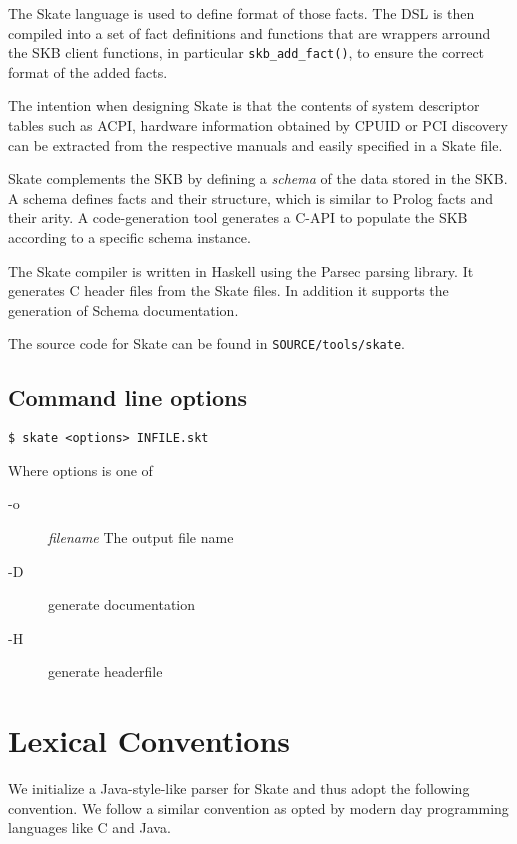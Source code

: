 \documentclass[a4paper,11pt,twoside]{report}
\begin{document}
{{The Skate language is used to define format of those facts. The DSL is then 
compiled into a set of fact definitions and functions that are wrappers arround
the SKB client functions, in particular \texttt{skb\_add\_fact()}, to ensure
the correct format of the added facts.  

The intention when designing Skate is that the contents of system descriptor
tables such as ACPI, hardware information obtained by CPUID or PCI discovery
can be extracted from the respective manuals and easily specified in a Skate 
file. 

Skate complements the SKB by defining a \emph{schema} of the data stored in
the SKB. A schema defines facts and their structure, which is similar to Prolog
facts and their arity. A code-generation tool generates a C-API to populate the
SKB according to a specific schema instance.

The Skate compiler is written in Haskell using the Parsec parsing library. It
generates C header files from the Skate files. In addition it supports the 
generation of Schema documentation.

The source code for Skate can be found in \texttt{SOURCE/tools/skate}.


\section{Command line options}
\label{sec:cmdline}

\begin{verbatim}
$ skate <options> INFILE.skt
\end{verbatim}


Where options is one of
\begin{description}
  \item[-o] \textit{filename} The output file name
  \item[-D] generate documentation
  \item[-H] generate headerfile
\end{description}



\chapter{Lexical Conventions}
\label{chap:lexer}

We initialize a Java-style-like parser for Skate and thus adopt the following
convention. We follow a similar convention as opted by modern day programming 
languages like C and Java.

}}
\end{document}
